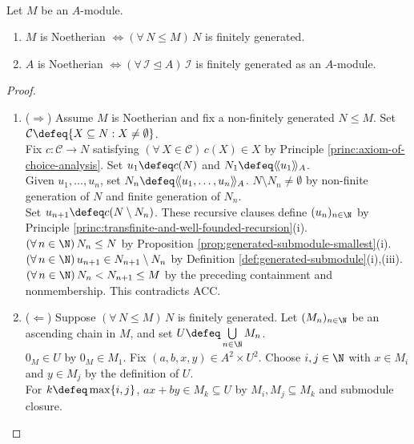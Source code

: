 \begin{theorem} \label{thm:noetherian-iff-submodules-finitely-generated} \\
Let $M$ be an $A$-module.
\begin{enumerate}[label=(\roman*)]
\setlength{\itemsep}{0pt}
\item $M$ is Noetherian $\Longleftrightarrow(\forall\,N\leq M)\,N$ is finitely generated.
\item $A$ is Noetherian $\Longleftrightarrow(\forall\,\mathcal{I}\trianglelefteq A)\,\mathcal{I}$ is finitely generated as an $A$-module.
\end{enumerate}
\begin{proof}
\begin{enumerate}[label=(\roman*)]
\setlength{\itemsep}{0pt}
\item[$(i)$] ($\Rightarrow$) Assume $M$ is Noetherian and fix a non-finitely generated $N\leq M$. Set $\mathcal{C}\defeq\{X\subseteq N:X\neq\emptyset\}$.\\
Fix $c:\mathcal{C}\to N$ satisfying $(\forall\,X\in\mathcal{C})\,c(X)\in X$ by Principle \ref{princ:axiom-of-choice-analysis}. Set $u_1\defeq c(N)$ and $N_1\defeq\langle\!\langle u_1\rangle\!\rangle_A$.\\
Given $u_1,\ldots,u_n$, set $N_n\defeq\langle\!\langle u_1,\ldots,u_n\rangle\!\rangle_A$. $N\setminus N_n\neq\emptyset$ by non-finite generation of $N$ and finite generation of $N_n$.\\
Set $u_{n+1}\defeq c(N\setminus N_n)$. These recursive clauses define $(u_n)_{n\in\N}$ by Principle \ref{princ:transfinite-and-well-founded-recursion}(i).\\
$(\forall\,n\in\N)\,N_n\leq N$ by Proposition \ref{prop:generated-submodule-smallest}(i). $(\forall\,n\in\N)\,u_{n+1}\in N_{n+1}\setminus N_n$ by Definition \ref{def:generated-submodule}(i),(iii).\\
$(\forall\,n\in\N)\,N_n<N_{n+1}\leq M$ by the preceding containment and nonmembership. This contradicts ACC.
\item[$(i)$] ($\Leftarrow$) Suppose $(\forall\,N\leq M)\,N$ is finitely generated. Let $(M_n)_{n\in\N}$ be an ascending chain in $M$, and set $U\defeq\bigcup\limits_{n\in\N}M_n$.\\
$0_M\in U$ by $0_M\in M_1$. Fix $(a,b,x,y)\in A^2\times U^2$. Choose $i,j\in\N$ with $x\in M_i$ and $y\in M_j$ by the definition of $U$.\\
For $k\defeq\max\{i,j\}$, $ax+by\in M_k\subseteq U$ by $M_i,M_j\subseteq M_k$ and submodule closure.\\

\end{enumerate}
\end{proof}
\end{theorem}
